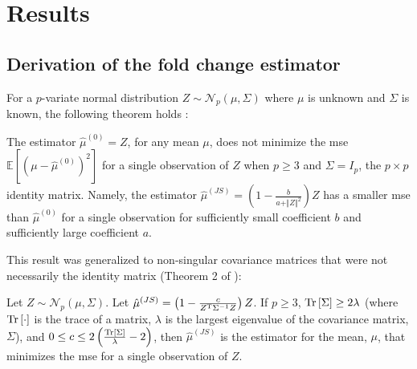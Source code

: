 \section{Results}

\subsection{Derivation of the  fold change estimator}
\label{sec:JS_derivation}

For a $p$-variate normal distribution $Z \sim \mathcal{N}_p(\mu, \Sigma)$ where $\mu$ is unknown and $\Sigma$ is known, the following theorem holds \cite{steinInadmissibilityUsualEstimator1956}:

\begin{theorem}
  The estimator $\hat{\mu}^{(0)} = Z$, for any mean $\mu$, does not minimize the \gls{mse} $\mathbb{E} \left[ (\mu - \hat{\mu}^{(0)})^2 \right]$ for a single observation of $Z$ when $p \ge 3$ and $\Sigma = I_p$, the $p \times p$ identity matrix.
  Namely, the estimator $\hat{\mu}^{(JS)} = \left( 1 - \frac{b}{a + \Vert Z \Vert ^2}\right) Z$ has a smaller \gls{mse} than $\hat{\mu}^{(0)}$ for a single observation for sufficiently small coefficient $b$ and sufficiently large coefficient $a$.
\end{theorem}

This result was generalized to non-singular covariance matrices that were not necessarily the identity matrix (Theorem 2 of \cite[REF][]{bockMinimaxEstimatorsMean1975}):

\begin{theorem}
  Let $Z \sim \mathcal{N}_p \left(\mu, \Sigma \right)$.
  Let $\hat{\mu}^{(JS)} = \left( 1 - \frac{c}{Z^{\mathrm{T}} \Sigma^{-1} Z}\right) Z$.
  If $p \ge 3$, $\mathrm{Tr} \left[ \Sigma \right] \ge 2 \lambda$ (where $\mathrm{Tr} \left[ \cdot \right]$ is the trace of a matrix, $\lambda$ is the largest eigenvalue of the covariance matrix, $\Sigma$), and $0 \le c \le 2 \left( \frac{\mathrm{Tr} \left[ \Sigma \right]}{\lambda} - 2 \right)$, then $\hat{\mu}^{(JS)}$ is the estimator for the mean, $\mu$, that minimizes the \gls{mse} for a single observation of $Z$.
\end{theorem}


